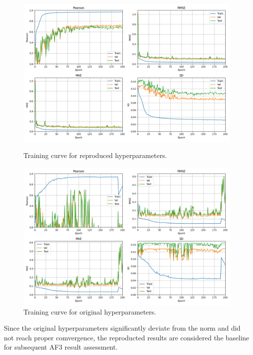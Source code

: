 \documentclass[unnumsec,webpdf,contemporary,large]{oup-authoring-template}
\theoremstyle{thmstyleone}%
\theoremstyle{thmstyletwo}%
\theoremstyle{thmstylethree}%
\begin{document}
\begin{figure}[H]
    \centering
    \begin{minipage}{0.5\textwidth}
        \centering
        \includegraphics[width=\textwidth]{images/normal_converge.png}
        \caption{Training curve for reproduced hyperparameters.}
        \label{fig:ReproducedPlot}
    \end{minipage}\hfill
    \begin{minipage}{0.5\textwidth}
        \centering
        \includegraphics[width=\textwidth]{images/origin_param.png}
        \caption{Training curve for original hyperparameters.}
        \label{fig:OriginalPlot}
    \end{minipage}
\end{figure}

\vspace{-2.5em}
Since the original hyperparameters significantly deviate from the 
norm and did not reach proper comvergence,
the reproducted results are 
considered the baseline for subsequent AF3 result assessment.
\end{document}
